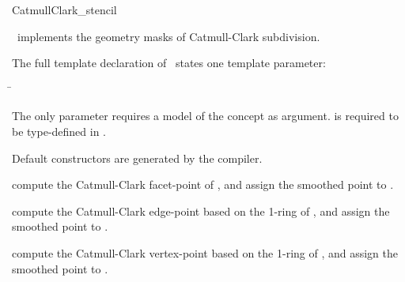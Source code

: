 \begin{ccRefClass}{CatmullClark_stencil}

\ccDefinition

\ccClassTemplateName\ implements the geometry masks of 
Catmull-Clark subdivision. 


\ccParameters

The full template declaration of \ccClassTemplateName\ states one
template parameter:

\begin{tabbing}
 \= 
\end{tabbing}
   
The only parameter requires a model of 
the  concept as argument. 
 is required to be type-defined in .

\ccCreation

Default constructors are generated by the compiler.

\ccThree{}{}{}

{compute the Catmull-Clark facet-point of , 
and assign the smoothed point to .}

{compute the Catmull-Clark edge-point based on the 1-ring
of , and assign the smoothed point to .}

{compute the Catmull-Clark vertex-point based on the 
1-ring of , and assign the smoothed point to .}


\ccSeeAlso

\\
\\
\\

\end{ccRefClass}

\ccRefPageEnd


